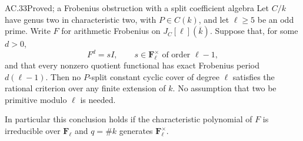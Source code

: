 \begin{claim}{AC.33}{Proved; a Frobenius obstruction with a split coefficient algebra}
Let \(C/k\) have genus two in characteristic two, with
\(P\in C(k)\), and let \(\ell\ge5\) be an odd prime.
Write \(F\) for arithmetic Frobenius on \(J_C[\ell](\overline k)\).
Suppose that, for some \(d>0\),
\[
 F^d=sI,\qquad s\in\mathbf F_\ell^\times
       \text{ of order }\ell-1,
\]
and that every nonzero quotient functional has exact Frobenius
period \(d(\ell-1)\).
Then no \(P\)-split constant cyclic cover of degree \(\ell\)
satisfies the rational criterion over any finite extension of \(k\).
No assumption that two be primitive modulo \(\ell\) is needed.

In particular this conclusion holds if the characteristic
polynomial of \(F\) is irreducible over \(\mathbf F_\ell\)
and \(q=\#k\) generates \(\mathbf F_\ell^\times\).
\end{claim}
